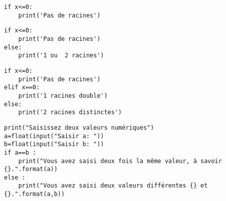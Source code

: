 \documentclass[10pt,dvipsnames,  dvips]{article}
\begin{document}

\hspace{-0.5cm}
\begin{minipage}[t]{5.6cm}
\begin{lstlisting}
if x<=0:
	print('Pas de racines')
\end{lstlisting}
\end{minipage}
\hspace{0.1cm}
\begin{minipage}[t]{6cm}
\begin{lstlisting}
if x<=0:
	print('Pas de racines')
else:
	print('1 ou  2 racines')
\end{lstlisting}
\end{minipage}
\hspace{0.1cm}
\begin{minipage}[t]{6.7cm}
\begin{lstlisting}
if x<=0:
	print('Pas de racines')
elif x==0:
	print('1 racines double')
else:
	print('2 racines distinctes')
\end{lstlisting}
\end{minipage}

\begin{lstlisting}
print("Saisissez deux valeurs numériques")
a=float(input("Saisir a: "))
b=float(input("Saisir b: "))
if a==b :
	print("Vous avez saisi deux fois la même valeur, à savoir {}.".format(a))
else :
	print("Vous avez saisi deux valeurs différentes {} et {}.".format(a,b))
\end{lstlisting}
\end{document}
